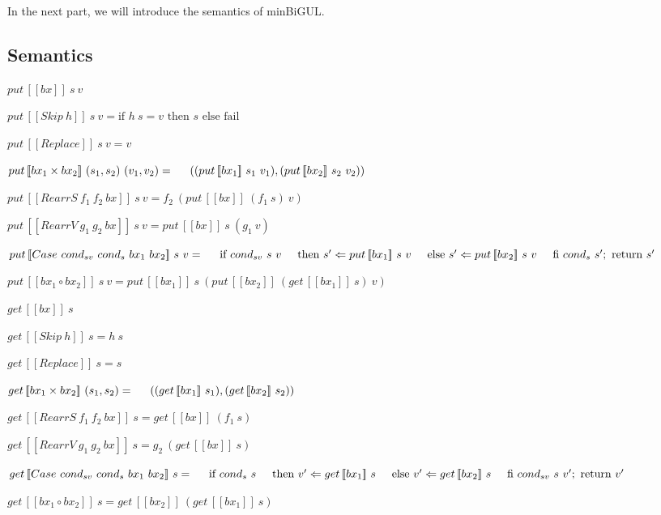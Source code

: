 \documentclass[runningheads]{llncs}
\newcommand{\tab}{\hspace*{5mm}}
\newcommand{\sif}[3]{\text{if } #1 \text{ then } #2 \text{ else } #3}
\newcommand{\product}[2]{#1 \times #2}
\newcommand{\rearrs}[3]{RearrS \ #1 \ #2 \ #3}
\newcommand{\rearrv}[3]{RearrV \ #1 \ #2 \ #3}
\newcommand{\casebx}[4]{Case \ #1 \ #2 \ #3 \ #4}
\newcommand{\putbx}[3]{put \, [\![#1]\!] \ #2 \ #3}
\newcommand{\getbx}[2]{get \, [\![#1]\!] \ #2}
\begin{document}
In the next part, we will introduce the semantics of minBiGUL.

\subsection{Semantics}

\begin{definition}
    $\putbx{bx}{s}{v}$

    $\putbx{Skip \ h}{s}{v} = \sif{h \ s = v}{s}{\text{fail}}$

    $\putbx{Replace}{s}{v} = v$

    $\putbx{\product{bx_1}{bx_2}}{(s_1, s_2)}{(v_1, v_2)} =\\
        \tab ((\putbx{bx_1}{s_1}{v_1}),(\putbx{bx_2}{s_2}{v_2}))$

    $\putbx{\rearrs{f_1}{f_2}{bx}}{s}{v} = f_2 \ (\putbx{bx}{(f_1 \ s)}{v})$

    $\putbx{\rearrv{g_1}{g_2}{bx}}{s}{v} = \putbx{bx}{s}{(g_1 \ v)}$

    $\putbx{\casebx{cond_{sv}}{cond_{s}}{bx_1}{bx_2}}{s}{v} = \\
        \tab \text{if} \ {cond_{sv} \ s \ v} \\
        \tab \text{then} \ s' \Leftarrow \putbx{bx_1}{s}{v} \\
        \tab \text{else} \ s' \Leftarrow \putbx{bx_2}{s}{v} \\
        \tab \text{fi} \ cond_{s} \ s'; \ \text{return} \ s'$

    $\putbx{bx_1 \circ bx_2}{s}{v} = \putbx{bx_1}{s}{(\putbx{bx_2}{(\getbx{bx_1}{s})}{v})}$
\end{definition}

\begin{definition}
    $\getbx{bx}{s}$

    $\getbx{Skip \ h}{s} = h \ s$

    $\getbx{Replace}{s} = s$

    $\getbx{\product{bx_1}{bx_2}}{(s_1,s_2)} = \\
        \tab ((\getbx{bx_1}{s_1}),(\getbx{bx_2}{s_2}))$

    $\getbx{\rearrs{f_1}{f_2}{bx}}{s} = \getbx{bx}{(f_1 \ s)}$

    $\getbx{\rearrv{g_1}{g_2}{bx}}{s} = g_2 \ (\getbx{bx}{s})$

    $\getbx{\casebx{cond_{sv}}{cond_{s}}{bx_1}{bx_2}}{s} =\\
        \tab \text{if} \ {cond_{s} \ s}\\
        \tab \text{then} \ v' \Leftarrow \getbx{bx_1}{s}\\
        \tab \text{else} \ v' \Leftarrow \getbx{bx_2}{s}\\
        \tab \text{fi} \ {cond_{sv} \ s \ v'}; \ \text{return} \ v'$

    $\getbx{bx_1 \circ bx_2}{s} = \getbx{bx_2}{(\getbx{bx_1}{s})}$
\end{definition}
\end{document}
